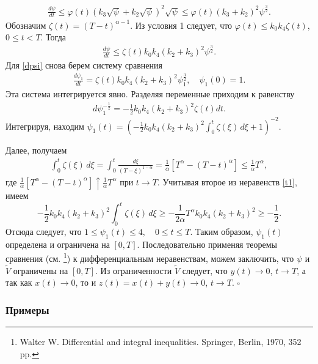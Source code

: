 \documentclass[../main.tex]{subfiles}
\begin{document}
	\begin{gather*}
			\frac{d\psi}{dt} \leqslant \varphi (t) \left(k_3 \sqrt{\psi} + k_2\sqrt{\psi}\right)^2 \sqrt{\psi} \leqslant \varphi(t) (k_3 + k_2)^2 \psi^\frac{3}{2}.
	\end{gather*}
	Обозначим $  \zeta (t) = {(T - t)^{\alpha-1}}$.
	 Из условия 1 следует, что  $\varphi(t) \leqslant k_0k_4\zeta (t)$, $0 \leqslant t<T$. Тогда 
	\begin{gather}\label{dpsi}
			\frac{d\psi}{dt} \leqslant  \zeta(t) k_0k_4(k_2 + k_3)^2 \psi^\frac{3}{2}.
	\end{gather}
	Для \eqref{dpsi} снова берем систему сравнения 
	\begin{gather*}
			\frac{d\psi_1}{dt} = \zeta (t) k_0k_4 (k_2 + k_3)^2 \psi_1^\frac{3}{2}, \quad \psi_1(0)=1.
	\end{gather*}
	Эта система интегрируется явно.
	Разделяя переменные приходим к равенству
	\begin{gather*}
			d\psi_1^{- \frac{1}{2}} = - \frac{1}{2} k_0 k_4 (k_2 + k_3)^2 \zeta (t) dt.
	\end{gather*}
	Интегрируя, находим $\psi_1(t) =  \left(-\frac{1}{2} k_0 k_4 (k_2 + k_3)^2 \displaystyle{\int^t_{0}} \zeta (\xi) \, d\xi +1\right)^{-2}. $
	
	
	Далее, получаем \begin{gather*}
			\int^t_{0} \zeta (\xi) \, d\xi = \int^t_{0} \frac{d\xi}{(T - \xi)^{1-\alpha}} = \frac{1}{\alpha} \left[ T ^\alpha -  (T - t)^\alpha \right] \leqslant \frac{1}{\alpha} T ^\alpha, 
	\end{gather*}
	где $\frac{1}{\alpha} \left[T ^\alpha -  (T - t)^\alpha \right]  \uparrow  \frac{1}{\alpha} T ^\alpha$ при $ t\rightarrow T $. Учитывая второе из неравенств \eqref{t1}, имеем
	$$-\frac{1}{2} k_0 k_4 (k_2 + k_3)^2 \int^t_{0} \zeta (\xi) \, d\xi \geqslant -\frac{1}{2\alpha} T ^\alpha  k_0 k_4 (k_2 + k_3)^2 \geqslant -\frac{1}{2}. $$
	Отсюда следует, что 
	$ 1 \leqslant \psi_1(t) \leqslant 4, \quad 0 \leqslant t \leqslant T$.
	Таким образом, $\psi_1 (t)$ определена и ограничена на $[0, T]$. Последовательно применяя теоремы сравнения (см.  \footnote{Walter W. Differential and integral inequalities. Springer, Berlin, 1970, 352 pp.}) к дифференциальным неравенствам,  можем заключить, что  $\psi$ и $\widetilde{V}$ ограничены на $[0, T]$. Из ограниченности $\widetilde{V}$ следует, что $y(t) \rightarrow 0$, $t \rightarrow T$, а так как $x(t) \rightarrow 0$, то и $z(t) = x(t) + y(t) \rightarrow 0$, $t \rightarrow T$.
	\hfill $\square$
	\subsubsection{Примеры}
	
\end{document}
